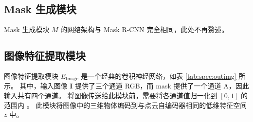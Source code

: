 \subsection{Mask 生成模块}
Mask 生成模块 $M$ 的网络架构与 Mask R-CNN\cite{maskrcnn} 完全相同，此处不再赘述。

\subsection{图像特征提取模块}

图像特征提取模块 $E_{\text{Image}}$ 是一个经典的卷积神经网络，如表 \ref{tab:spec:outimg} 所示。
其中，输入图像 $\bm I$ 提供了三个通道 RGB，而 mask 提供了一个通道 A，因此输入共有四个通道。
将图像传送给此模块前，需要将各通道值归一化到 $[0, 1]$ 的范围内
。
此模块将图像中的三维物体编码到与点云自编码器相同的低维特征空间 $z$ 中。


